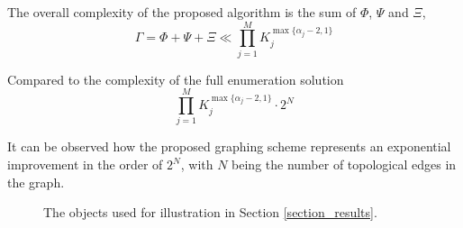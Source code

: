 \documentclass[conference]{IEEEtran}
\begin{document}
The overall complexity of the proposed algorithm is the sum of $\Phi$, $\Psi$ and $\Xi$, 
\begin{equation}
\Gamma =\Phi+\Psi+\Xi \ll  \prod\limits_{j = 1}^M K_j^{\max\{\alpha_j-2, 1\}}
\end{equation}

Compared to the complexity of the full enumeration solution~\cite{Yang2020Cellular}
\begin{equation}
\prod\limits_{j = 1}^M K_j^{\max\{\alpha_j-2, 1\}}\cdot 2^N
\end{equation}

It can be observed how the proposed graphing scheme represents an exponential improvement in 
the order of $2^N$, with $N$ being the number of topological edges in the graph. 


\begin{figure}[t]
\centering
{}
\caption{The objects used for illustration in Section \ref{section_results}. }\label{fig:object}
\end{figure}
\end{document}
